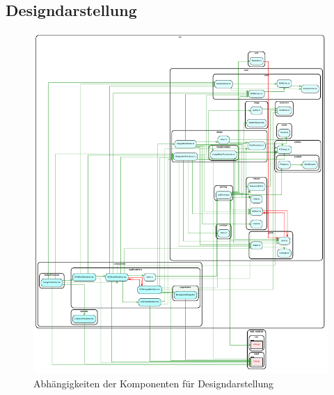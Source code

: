 \subsection{Designdarstellung}

\begin{figure}[H]
    \centering
    \includegraphics{diagrams/Ist-Architektur/design-presenter-analysis.pdf}
    \caption{Abhängigkeiten der Komponenten für Designdarstellung}
    \label{fig:Designdarstellung}
\end{figure}
  
